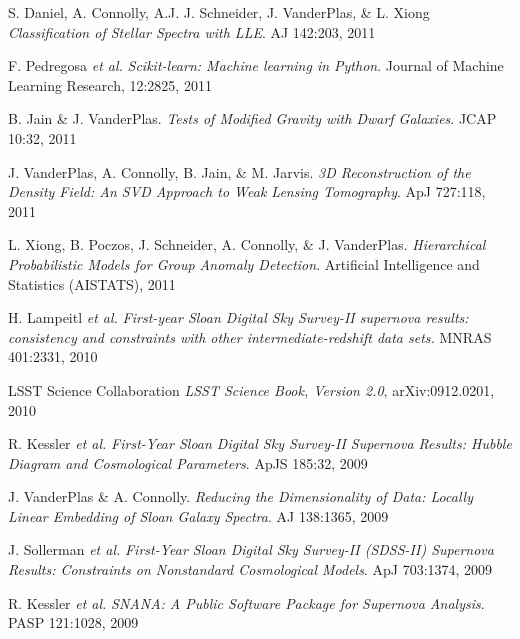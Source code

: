 \documentclass{article} %
\def\sl{\slshape}
\begin{document}
{\begin{itemize}[leftmargin=0ex, itemsep=0ex, parsep=.5ex, labelindent=-4ex]
    \publication
      S. Daniel, A. Connolly, A.J. J. Schneider, J. VanderPlas, \& L. Xiong
      {\sl Classification of Stellar Spectra with LLE}.
      AJ 142:203, 2011

    \publication
      F. Pedregosa {\sl et al.}
      {\sl Scikit-learn: Machine learning in Python}.
      Journal of Machine Learning Research, 12:2825, 2011

    \publication
      B. Jain \& J. VanderPlas.
      {\sl Tests of Modified Gravity with Dwarf Galaxies}.
      JCAP 10:32, 2011

    \publication
      J. VanderPlas, A. Connolly, B. Jain, \& M. Jarvis.
      {\sl 3D Reconstruction of the Density Field: An SVD Approach
        to Weak Lensing Tomography}.
      ApJ 727:118, 2011

    \publication
      L. Xiong, B. Poczos, J. Schneider, A. Connolly, \& J. VanderPlas.
      {\sl Hierarchical Probabilistic Models for Group Anomaly Detection}.
      Artificial Intelligence and Statistics (AISTATS), 2011

    \publication
      H. Lampeitl {\sl et al.}
      {\sl First-year Sloan Digital Sky Survey-II supernova results:
      consistency and constraints with other intermediate-redshift data sets.}
      MNRAS 401:2331, 2010

    \publication
      LSST Science Collaboration
      {\sl LSST Science Book, Version 2.0}, arXiv:0912.0201, 2010

    \publication
      R. Kessler {\it et al.}
      {\it First-Year Sloan Digital Sky Survey-II Supernova Results:
      Hubble Diagram and Cosmological Parameters}.
      ApJS 185:32, 2009

    \publication
      J. VanderPlas \& A. Connolly.
      {\it Reducing the Dimensionality of Data: Locally
      Linear Embedding of Sloan Galaxy Spectra}.
      AJ 138:1365, 2009

    \publication
      J. Sollerman {\sl et al.}
      {\it First-Year Sloan Digital Sky Survey-II (SDSS-II) Supernova
      Results: Constraints on Nonstandard Cosmological Models}.
      ApJ 703:1374, 2009

    \publication
      R. Kessler {\it et al.}
      {\it SNANA: A Public Software Package for Supernova Analysis}.
      PASP 121:1028, 2009

  \end{itemize}
}
\end{document}
